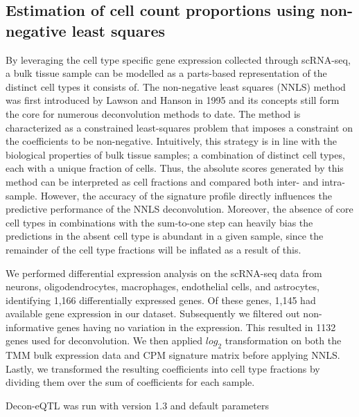 \subsection{Estimation of cell count proportions using non-negative least squares}
By leveraging the cell type specific gene expression collected through scRNA-seq, a bulk tissue sample can be modelled as a parts-based representation of the distinct cell types it consists of. The non-negative least squares (NNLS) method was first introduced by Lawson and Hanson in 1995\cite{lawsonSolvingLeastSquares1995} and its concepts still form the core for numerous deconvolution methods to date. The method is characterized as a constrained least-squares problem that imposes a constraint on the coefficients to be non-negative. Intuitively, this strategy is in line with the biological properties of bulk tissue samples; a combination of distinct cell types, each with a unique fraction of cells. Thus, the absolute scores generated by this method can be interpreted as cell fractions and compared both inter- and intra-sample\cite{sturmComprehensiveEvaluationComputational2018}. However, the accuracy of the signature profile directly influences the predictive performance of the NNLS deconvolution. Moreover, the absence of core cell types in combinations with the sum-to-one step can heavily bias the predictions in the absent cell type is abundant in a given sample, since the remainder of the cell type fractions will be inflated as a result of this. 

We performed differential expression analysis on the scRNA-seq data from neurons, oligodendrocytes, macrophages, endothelial cells, and astrocytes, identifying 1,166 differentially expressed genes. Of these genes, 1,145 had available gene expression in our dataset. Subsequently we filtered out non-informative genes having no variation in the expression. This resulted in 1132 genes used for deconvolution. We then applied $log_2$ transformation on both the TMM bulk expression data and CPM signature matrix before applying NNLS. Lastly, we transformed the resulting coefficients into cell type fractions by dividing them over the sum of coefficients for each sample\cite{galtonRegressionMediocrityHereditary1886}. 

Decon-eQTL\cite{raulaguirregamboaDeconvolutionBulkBlood2020} was run with version 1.3 and default parameters

